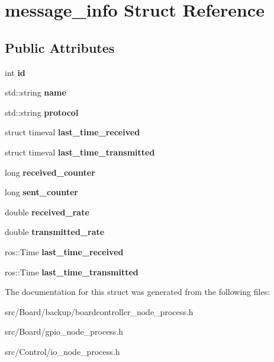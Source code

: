 \hypertarget{structmessage__info}{}\section{message\+\_\+info Struct Reference}
\label{structmessage__info}
\subsection*{Public Attributes}
\begin{DoxyCompactItemize}
\item 
\mbox{\label{structmessage__info_a7788b81571c373b01b90e576872e24fb}} 
int {\bfseries id}
\item 
\mbox{\label{structmessage__info_a06031f5050ddebd83479ab3b09842728}} 
std\+::string {\bfseries name}
\item 
\mbox{\label{structmessage__info_ac0dfe7f0323d87e647d047daefa0d0ec}} 
std\+::string {\bfseries protocol}
\item 
\mbox{\label{structmessage__info_a5a93b2a99c85f8e829970fcbb3b5c4ac}} 
struct timeval {\bfseries last\+\_\+time\+\_\+received}
\item 
\mbox{\label{structmessage__info_a10e4c118fcec201508c32e747e9a653d}} 
struct timeval {\bfseries last\+\_\+time\+\_\+transmitted}
\item 
\mbox{\label{structmessage__info_adadc66f792fa12df9d1e4aa2099e23cc}} 
long {\bfseries received\+\_\+counter}
\item 
\mbox{\label{structmessage__info_af907da66d78d1033236522cf64406137}} 
long {\bfseries sent\+\_\+counter}
\item 
\mbox{\label{structmessage__info_af8a56ba549952e8f4bbcd7578e69c321}} 
double {\bfseries received\+\_\+rate}
\item 
\mbox{\label{structmessage__info_a36b99ab78d7c247d7df5c2a8311ad6cc}} 
double {\bfseries transmitted\+\_\+rate}
\item 
\mbox{\label{structmessage__info_a5a93b2a99c85f8e829970fcbb3b5c4ac}} 
ros\+::\+Time {\bfseries last\+\_\+time\+\_\+received}
\item 
\mbox{\label{structmessage__info_a10e4c118fcec201508c32e747e9a653d}} 
ros\+::\+Time {\bfseries last\+\_\+time\+\_\+transmitted}
\end{DoxyCompactItemize}


The documentation for this struct was generated from the following files\+:\begin{DoxyCompactItemize}
\item 
src/\+Board/backup/boardcontroller\+\_\+node\+\_\+process.\+h\item 
src/\+Board/gpio\+\_\+node\+\_\+process.\+h\item 
src/\+Control/io\+\_\+node\+\_\+process.\+h\end{DoxyCompactItemize}
